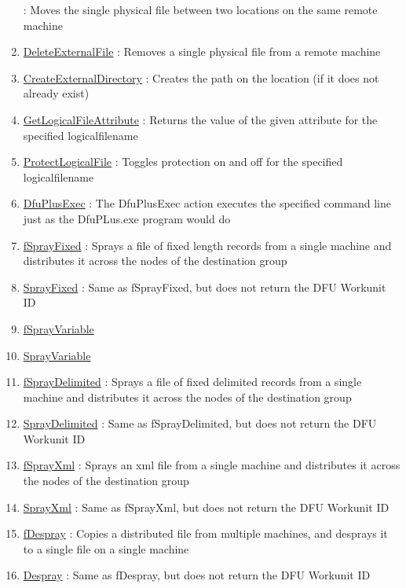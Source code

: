 \begin{enumerate}
: Moves the single physical file between two locations on the same remote machine
\item \hyperlink{ecldoc:file.deleteexternalfile}{DeleteExternalFile}
: Removes a single physical file from a remote machine
\item \hyperlink{ecldoc:file.createexternaldirectory}{CreateExternalDirectory}
: Creates the path on the location (if it does not already exist)
\item \hyperlink{ecldoc:file.getlogicalfileattribute}{GetLogicalFileAttribute}
: Returns the value of the given attribute for the specified logicalfilename
\item \hyperlink{ecldoc:file.protectlogicalfile}{ProtectLogicalFile}
: Toggles protection on and off for the specified logicalfilename
\item \hyperlink{ecldoc:file.dfuplusexec}{DfuPlusExec}
: The DfuPlusExec action executes the specified command line just as the DfuPLus.exe program would do
\item \hyperlink{ecldoc:file.fsprayfixed}{fSprayFixed}
: Sprays a file of fixed length records from a single machine and distributes it across the nodes of the destination group
\item \hyperlink{ecldoc:file.sprayfixed}{SprayFixed}
: Same as fSprayFixed, but does not return the DFU Workunit ID
\item \hyperlink{ecldoc:file.fsprayvariable}{fSprayVariable}
\item \hyperlink{ecldoc:file.sprayvariable}{SprayVariable}
\item \hyperlink{ecldoc:file.fspraydelimited}{fSprayDelimited}
: Sprays a file of fixed delimited records from a single machine and distributes it across the nodes of the destination group
\item \hyperlink{ecldoc:file.spraydelimited}{SprayDelimited}
: Same as fSprayDelimited, but does not return the DFU Workunit ID
\item \hyperlink{ecldoc:file.fsprayxml}{fSprayXml}
: Sprays an xml file from a single machine and distributes it across the nodes of the destination group
\item \hyperlink{ecldoc:file.sprayxml}{SprayXml}
: Same as fSprayXml, but does not return the DFU Workunit ID
\item \hyperlink{ecldoc:file.fdespray}{fDespray}
: Copies a distributed file from multiple machines, and desprays it to a single file on a single machine
\item \hyperlink{ecldoc:file.despray}{Despray}
: Same as fDespray, but does not return the DFU Workunit ID

\end{enumerate}
